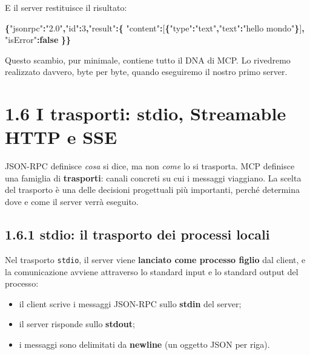 \documentclass[
  italian,
  10pt,
]{book}
\newenvironment{Shaded}{\begin{snugshade}}{\end{snugshade}}
\newcommand{\DataTypeTok}[1]{\textcolor[rgb]{0.13,0.29,0.53}{#1}}
\newcommand{\DecValTok}[1]{\textcolor[rgb]{0.00,0.00,0.81}{#1}}
\newcommand{\FunctionTok}[1]{\textcolor[rgb]{0.13,0.29,0.53}{\textbf{#1}}}
\newcommand{\KeywordTok}[1]{\textcolor[rgb]{0.13,0.29,0.53}{\textbf{#1}}}
\newcommand{\OtherTok}[1]{\textcolor[rgb]{0.56,0.35,0.01}{#1}}
\newcommand{\StringTok}[1]{\textcolor[rgb]{0.31,0.60,0.02}{#1}}
\providecommand{\tightlist}{%
  \setlength{\itemsep}{0pt}\setlength{\parskip}{0pt}}
\begin{document}
E il server restituisce il risultato:

\begin{Shaded}
\begin{Highlighting}[]
\FunctionTok{\{}\DataTypeTok{"jsonrpc"}\FunctionTok{:}\StringTok{"2.0"}\FunctionTok{,}\DataTypeTok{"id"}\FunctionTok{:}\DecValTok{3}\FunctionTok{,}\DataTypeTok{"result"}\FunctionTok{:\{}
  \DataTypeTok{"content"}\FunctionTok{:}\OtherTok{[}\FunctionTok{\{}\DataTypeTok{"type"}\FunctionTok{:}\StringTok{"text"}\FunctionTok{,}\DataTypeTok{"text"}\FunctionTok{:}\StringTok{"hello mondo"}\FunctionTok{\}}\OtherTok{]}\FunctionTok{,}
  \DataTypeTok{"isError"}\FunctionTok{:}\KeywordTok{false}
\FunctionTok{\}\}}
\end{Highlighting}
\end{Shaded}

Questo scambio, pur minimale, contiene tutto il DNA di MCP. Lo rivedremo
realizzato davvero, byte per byte, quando eseguiremo il nostro primo
server.

\section{1.6 I trasporti: stdio, Streamable HTTP e
SSE}\label{i-trasporti-stdio-streamable-http-e-sse}

JSON-RPC definisce \emph{cosa} si dice, ma non \emph{come} lo si
trasporta. MCP definisce una famiglia di \textbf{trasporti}: canali
concreti su cui i messaggi viaggiano. La scelta del trasporto è una
delle decisioni progettuali più importanti, perché determina dove e come
il server verrà eseguito.

\subsection{1.6.1 stdio: il trasporto dei processi
locali}\label{stdio-il-trasporto-dei-processi-locali}

Nel trasporto \texttt{stdio}, il server viene \textbf{lanciato come
processo figlio} dal client, e la comunicazione avviene attraverso lo
standard input e lo standard output del processo:

\begin{itemize}
\tightlist
\item
  il client scrive i messaggi JSON-RPC sullo \textbf{stdin} del server;
\item
  il server risponde sullo \textbf{stdout};
\item
  i messaggi sono delimitati da \textbf{newline} (un oggetto JSON per
  riga).
\end{itemize}
\end{document}

